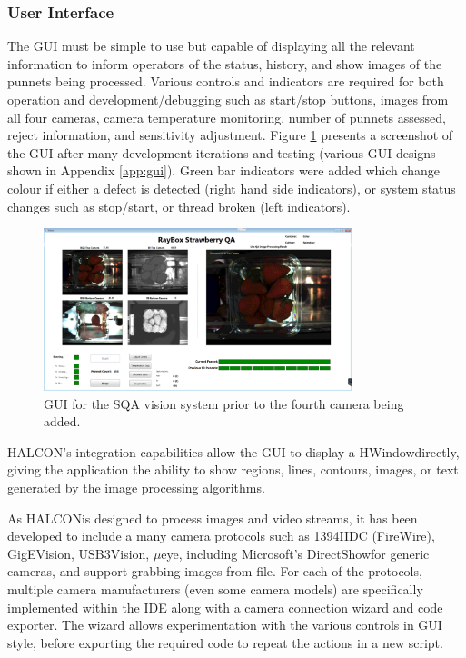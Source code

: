\documentclass[fleqn,twoside,12pt]{report}
\begin{document}
\subsubsection{User Interface}

The GUI must be simple to use but capable of displaying all the relevant information to inform operators of the status, history, and show images of the punnets being processed. Various controls and indicators are required for both operation and development/debugging such as start/stop buttons, images from all four cameras, camera temperature monitoring, number of punnets assessed, reject information, and sensitivity adjustment. Figure \ref{fig:GUI} presents a screenshot of the GUI after many development iterations and testing (various GUI designs shown in Appendix \ref{app:gui}). Green bar indicators were added which change colour if either a defect is detected (right hand side indicators), or system status changes such as stop/start, or thread broken (left indicators).  


\begin{figure}[h]
	\centering
	\includegraphics[width=0.8\textwidth]{GUI.png}
	\caption{GUI for the SQA vision system prior to the fourth camera being added.}
	\label{fig:GUI}
\end{figure}
  
  
HALCON\texttrademark's integration capabilities allow the GUI to display a HWindow\texttrademark directly, giving the application the ability to show regions, lines, contours, images, or text generated by the image processing algorithms. 

As HALCON\texttrademark is designed to process images and video streams, it has been developed to include a many camera protocols such as 1394IIDC (FireWire\texttrademark), GigEVision\textregistered, USB3Vision\textregistered, $\mu$eye\texttrademark, including Microsoft\textregistered's DirectShow\textregistered for generic cameras, and support grabbing images from file. For each of the protocols, multiple camera manufacturers (even some camera models) are specifically implemented within the IDE along with a camera connection wizard and code exporter. The wizard allows experimentation with the various controls in GUI style, before exporting the required code to repeat the actions in a new script. 
\end{document}
